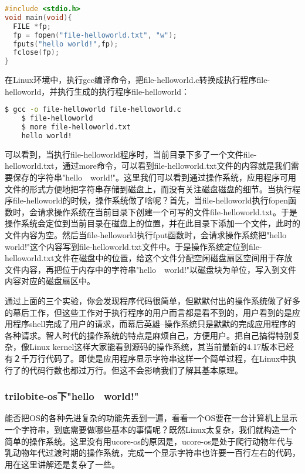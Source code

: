 \begin{lstlisting}[language={C}]
#include <stdio.h>
void main(void){
  FILE *fp;
  fp = fopen("file-helloworld.txt", "w");
  fputs("hello world!",fp);
  fclose(fp);
}
\end{lstlisting}

在Linux环境中，执行gcc编译命令，把file-helloworld.c转换成执行程序file-helloworld，并执行生成的执行程序file-helloworld：
\begin{lstlisting}[language={bash}]
	$ gcc -o file-helloworld file-helloworld.c
	$ file-helloworld
	$ more file-helloworld.txt
	hello world!	
\end{lstlisting}

可以看到，当执行file-helloworld程序时，当前目录下多了一个文件file-helloworld.txt，通过more命令，可以看到file-helloworld.txt文件的内容就是我们需要保存的字符串"hello　world!"。这里我们可以看到通过操作系统，应用程序可用文件的形式方便地把字符串存储到磁盘上，而没有关注磁盘磁盘的细节。当执行程序file-helloworld的时候，操作系统做了啥呢？首先，当file-helloworld执行fopen函数时，会请求操作系统在当前目录下创建一个可写的文件file-helloworld.txt。于是操作系统会定位到当前目录在磁盘上的位置，并在此目录下添加一个文件，此时的文件内容为空。然后当file-helloworld执行fput函数时，会请求操作系统把"hello　world!"这个内容写到file-helloworld.txt文件中。于是操作系统定位到file-helloworld.txt文件在磁盘中的位置，给这个文件分配空闲磁盘扇区空间用于存放文件内容，再把位于内存中的字符串"hello　world!"以磁盘块为单位，写入到文件内容对应的磁盘扇区中。

通过上面的三个实验，你会发现程序代码很简单，但默默付出的操作系统做了好多的幕后工作，但这些工作对于执行程序的用户而言都是看不到的，用户看到的是应用程序shell完成了用户的请求，而幕后英雄--操作系统只是默默的完成应用程序的各种请求。智人时代的操作系统的特点是麻烦自己，方便用户。把自己搞得特别复杂，像Linux kernel这样大家能看到源码的操作系统，其当前最新的4.17版本已经有２千万行代码了。即使是应用程序显示字符串这样一个简单过程，在Linux中执行了的代码行数也都过万行。但这不会影响我们了解其基本原理。

\subsubsection{trilobite-os下"hello　world!"}
能否把OS的各种先进复杂的功能先丢到一遍，看看一个OS要在一台计算机上显示一个字符串，到底需要做哪些基本的事情呢？既然Linux太复杂，我们就构造一个简单的操作系统。这里没有用ucore-os的原因是，ucore-os是处于爬行动物年代与乳动物年代过渡时期的操作系统，完成一个显示字符串也许要一百行左右的代码，用在这里讲解还是复杂了一些。

